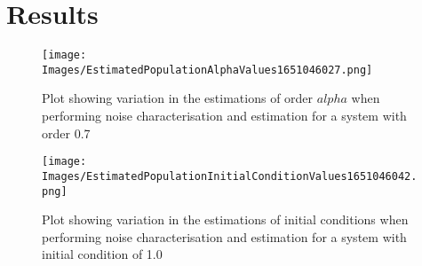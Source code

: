 \section{Results}

\begin{figure}[h]
	\centering
	\texttt{[image: Images/EstimatedPopulationAlphaValues1651046027.png]}
	\caption{Plot showing variation in the estimations of order $alpha$ when performing noise characterisation and estimation for a system with order 0.7}
\end{figure}

\begin{figure}[h]
	\centering
	\texttt{[image: Images/EstimatedPopulationInitialConditionValues1651046042.png]}
	\caption{Plot showing variation in the estimations of initial conditions when performing noise characterisation and estimation for a system with initial condition of 1.0}
\end{figure}
